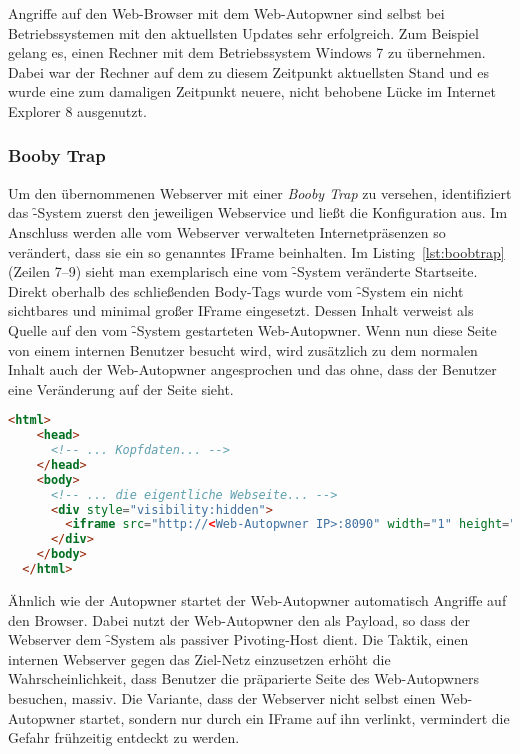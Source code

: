 Angriffe auf den Web-Browser mit dem Web-Autopwner sind selbst bei
Betriebssystemen mit den aktuellsten Updates sehr erfolgreich. Zum
Beispiel gelang es, einen Rechner mit dem Betriebssystem Windows 7 zu
übernehmen. Dabei war der Rechner auf dem zu diesem Zeitpunkt
aktuellsten Stand und es wurde eine zum damaligen Zeitpunkt neuere,
nicht behobene Lücke im Internet Explorer 8 ausgenutzt.

\subsubsection*{Booby Trap}
\label{subsec:boobytrap}

Um den übernommenen Webserver mit einer \textit{Booby Trap} zu versehen,
identifiziert das \f-System zuerst den jeweiligen Webservice und ließt die
Konfiguration aus. Im Anschluss werden alle vom Webserver verwalteten
Internetpräsenzen so verändert, dass sie ein so genanntes IFrame beinhalten. Im
Listing~\ref{lst:boobtrap} (Zeilen 7--9) sieht man exemplarisch eine vom
\f-System veränderte Startseite. Direkt oberhalb des schließenden Body-Tags
wurde vom \f-System ein nicht sichtbares und minimal großer IFrame eingesetzt.
Dessen Inhalt verweist als Quelle auf den vom \f-System gestarteten
Web-Autopwner. Wenn nun diese Seite von einem internen Benutzer besucht wird,
wird zusätzlich zu dem normalen Inhalt auch der Web-Autopwner angesprochen und
das ohne, dass der Benutzer eine Veränderung auf der Seite sieht.

\begin{lstlisting}[language=HTML,caption={Booby-Trap-Beispiel},label={lst:boobtrap}]
  <html>
    <head>
      <!-- ... Kopfdaten... -->
    </head>
    <body>
      <!-- ... die eigentliche Webseite... -->
      <div style="visibility:hidden">
        <iframe src="http://<Web-Autopwner IP>:8090" width="1" height="1" scrolling="no" frameborder="0" id="pwned"></iframe>
      </div>
    </body>
  </html>
\end{lstlisting}

Ähnlich wie der Autopwner startet der Web-Autopwner automatisch Angriffe auf
den Browser. Dabei nutzt der Web-Autopwner den  als Payload, so
dass der Webserver dem \f-System als passiver Pivoting-Host dient. Die Taktik,
einen internen Webserver gegen das Ziel-Netz einzusetzen erhöht die
Wahrscheinlichkeit, dass Benutzer die präparierte Seite des Web-Autopwners
besuchen, massiv. Die Variante, dass der Webserver nicht selbst einen
Web-Autopwner startet, sondern nur durch ein IFrame auf ihn verlinkt,
vermindert die Gefahr frühzeitig entdeckt zu werden.

